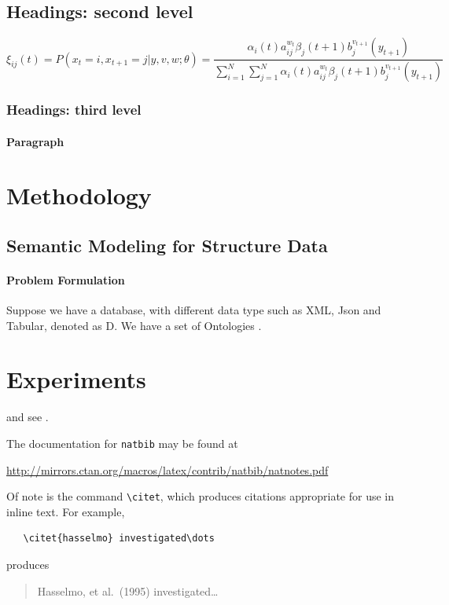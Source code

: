 \documentclass{article}
\begin{document}
\subsection{Headings: second level}
\lipsum[5]
\begin{equation}
\xi _{ij}(t)=P(x_{t}=i,x_{t+1}=j|y,v,w;\theta)= {\frac {\alpha _{i}(t)a^{w_t}_{ij}\beta _{j}(t+1)b^{v_{t+1}}_{j}(y_{t+1})}{\sum _{i=1}^{N} \sum _{j=1}^{N} \alpha _{i}(t)a^{w_t}_{ij}\beta _{j}(t+1)b^{v_{t+1}}_{j}(y_{t+1})}}
\end{equation}

\subsubsection{Headings: third level}
\lipsum[6]

\paragraph{Paragraph}
\lipsum[7]

\section{Methodology}
\subsection{Semantic Modeling for Structure Data}
\paragraph{Problem Formulation} Suppose we have a database, with different data type such as XML, Json and Tabular, denoted as D. We have a set of Ontologies \Omega.  

\section{Experiments}
\label{sec:others}
\lipsum[8] \cite{kour2014real,kour2014fast} and see \cite{hadash2018estimate}.

The documentation for \verb+natbib+ may be found at
\begin{center}
  \url{http://mirrors.ctan.org/macros/latex/contrib/natbib/natnotes.pdf}
\end{center}
Of note is the command \verb+\citet+, which produces citations
appropriate for use in inline text.  For example,
\begin{verbatim}
   \citet{hasselmo} investigated\dots
\end{verbatim}
produces
\begin{quote}
  Hasselmo, et al.\ (1995) investigated\dots
\end{quote}
\end{document}
